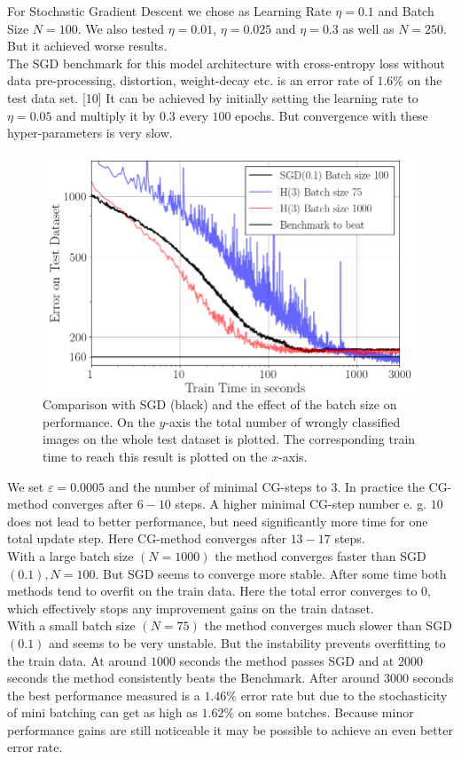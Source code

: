 \documentclass[conference]{IEEEtran}
\begin{document}
\noindent
For Stochastic Gradient Descent we chose as Learning Rate $\eta=0.1$ and Batch Size $N=100$. We also tested $\eta=0.01$, $\eta=0.025$ and $\eta=0.3$ as well as $N=250$. But it achieved worse results. \\
The SGD benchmark for this model architecture with cross-entropy loss without data pre-processing, distortion, weight-decay etc. is an error rate of $1.6\%$ on the test data set. [10] 
It can be achieved by initially setting the learning rate to $\eta=0.05$ and multiply it by $0.3$ every $100$ epochs. But convergence with these hyper-parameters is very slow.	
\begin{figure}[htbp]
	\centerline{\includegraphics[scale=0.52]{Plot_Batch_size.png}}
	\caption{Comparison with SGD (black) and the effect of the batch size on performance. On the $y$-axis the total number of wrongly classified images on the whole test dataset is plotted. The corresponding train time to reach this result is plotted on the $x$-axis.}
	\label{fig}
\end{figure}	

We set $\varepsilon=0.0005$ and the number of minimal CG-steps to $3$. In practice the CG-method converges after $6-10$ steps. A higher minimal CG-step number e. g. $10$ does not lead to better performance, but need significantly more time for one total update step. Here CG-method converges after $13-17$ steps.\\
With a large batch size $(N=1000)$ the method converges faster than SGD$(0.1), N=100.$ But SGD seems to converge more stable. After some time both methods tend to overfit on the train data. Here the total error converges to $0$, which effectively stops any improvement gains on the train dataset.\\
With a small batch size $(N=75)$ the method converges much slower than SGD$(0.1)$ and seems to be very unstable. But the instability prevents overfitting to the train data. At around $1000$ seconds the method passes SGD and at $2000$ seconds the method consistently beats the Benchmark. After around $3000$ seconds the best performance measured is a $1.46\%$ error rate but due to the stochasticity of mini batching can get as high as $1.62\%$ on some batches. Because minor performance gains are still noticeable it may be possible to achieve an even better error rate. \\
\end{document}
